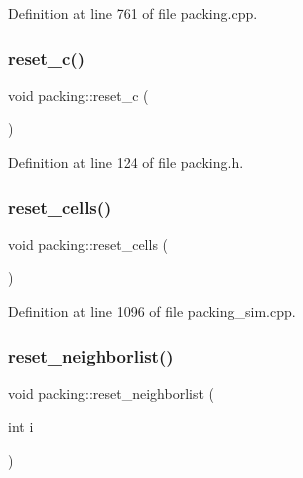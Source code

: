 Definition at line 761 of file packing.\+cpp.

\mbox{\label{classpacking_aa6f391cfee43bbb59dc71221a23c8d83}} 
\subsubsection{\texorpdfstring{reset\+\_\+c()}{reset\_c()}}
{\footnotesize\ttfamily void packing\+::reset\+\_\+c (\begin{DoxyParamCaption}{ }\end{DoxyParamCaption})\hspace{0.3cm}{\ttfamily [inline]}}



Definition at line 124 of file packing.\+h.

\mbox{\label{classpacking_a7f866169806cadb74aaed38e246d11e5}} 
\subsubsection{\texorpdfstring{reset\+\_\+cells()}{reset\_cells()}}
{\footnotesize\ttfamily void packing\+::reset\+\_\+cells (\begin{DoxyParamCaption}{ }\end{DoxyParamCaption})}



Definition at line 1096 of file packing\+\_\+sim.\+cpp.

\mbox{\label{classpacking_a9c073e15bbafc308692fb63f6390a843}} 
\subsubsection{\texorpdfstring{reset\+\_\+neighborlist()}{reset\_neighborlist()}}
{\footnotesize\ttfamily void packing\+::reset\+\_\+neighborlist (\begin{DoxyParamCaption}\item[{int}]{i }\end{DoxyParamCaption})}



